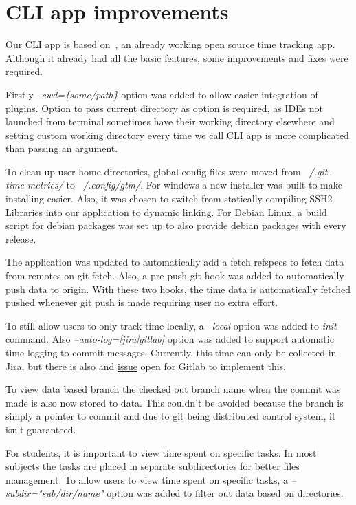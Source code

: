 \section{CLI app improvements}\label{sec:cli-app-improvements}
Our CLI app is based on~, an already working open source time tracking app.
Although it already had all the basic features, some improvements and fixes were required.

Firstly \textit{--cwd=\{some/path\}} option was added to allow easier integration of plugins.
Option to pass current directory as option is required, as IDEs not launched from terminal sometimes have their working
directory elsewhere and setting custom working directory every time we call CLI app is more complicated than passing an argument.

To clean up user home directories, global config files were moved from \textit{~/.git-time-metrics/} to \textit{~/.config/gtm/}.
For windows a new installer was built to make installing easier.
Also, it was chosen to switch from statically compiling SSH2 Libraries into our application to dynamic linking.
For Debian Linux, a build script for debian packages was set up to also provide debian packages with every release.

The application was updated to automatically add a fetch refspecs to fetch data from remotes on git fetch.
Also, a pre-push git hook was added to automatically push data to origin.
With these two hooks, the time data is automatically fetched pushed whenever git push is made requiring user no extra effort.

To still allow users to only track time locally, a \textit{--local} option was added to \textit{init} command.
Also \textit{--auto-log=[jira|gitlab]} option was added to support automatic time logging to commit messages.
Currently, this time can only be collected in Jira, but there is also and \href{https://gitlab.com/gitlab-org/gitlab/-/issues/16543}{issue}
open for Gitlab to implement this.

To view data based branch the checked out branch name when the commit was made is also now stored to data.
This couldn't be avoided because the branch is simply a pointer to commit and due to git being distributed control system,
it isn't guaranteed.

For students, it is important to view time spent on specific tasks.
In most subjects the tasks are placed in separate subdirectories for better files management.
To allow users to view time spent on specific tasks, a \textit{--subdir="sub/dir/name"} option was added to filter out
data based on directories.

